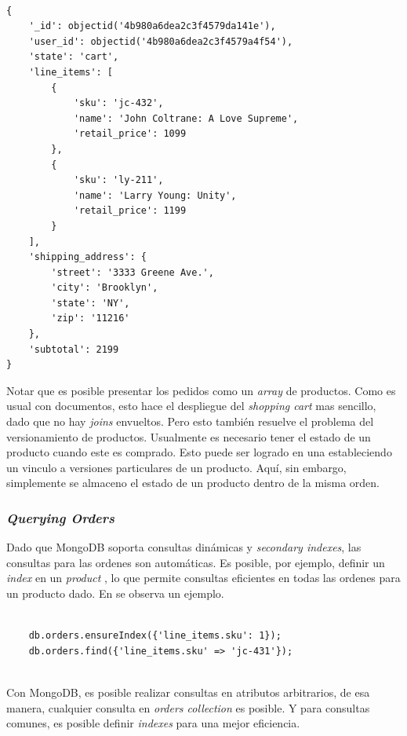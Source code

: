 \medskip
\begin{lstlisting}[caption= Estructura de una orden., label=source:javascript:example_schema_order]

{
	'_id': objectid('4b980a6dea2c3f4579da141e'),
	'user_id': objectid('4b980a6dea2c3f4579a4f54'),
	'state': 'cart',
	'line_items': [
		{
			'sku': 'jc-432',
			'name': 'John Coltrane: A Love Supreme',
			'retail_price': 1099
		},
		{
			'sku': 'ly-211',
			'name': 'Larry Young: Unity',
			'retail_price': 1199
		}
	],
	'shipping_address': {
		'street': '3333 Greene Ave.',
		'city': 'Brooklyn',
		'state': 'NY',
		'zip': '11216'
	},
	'subtotal': 2199
}
\end{lstlisting}

Notar que es posible presentar los pedidos como un \textit{array} de productos. Como es usual con documentos, esto hace el despliegue del \textit{shopping cart} mas sencillo, dado que no hay \textit{joins} envueltos. Pero esto también resuelve el problema del versionamiento de productos. Usualmente es necesario tener el estado de un producto cuando este es comprado. Esto puede ser logrado en una  estableciendo un vinculo a versiones particulares de un producto. Aquí, sin embargo, simplemente se almaceno el estado de un producto dentro de la misma orden.

\subsubsection{\textit{Querying Orders}}

Dado que MongoDB soporta consultas dinámicas y \textit{secondary indexes}, las consultas para las ordenes son automáticas. Es posible, por ejemplo, definir un \textit{index} en un \textit{product }, lo que permite consultas eficientes en todas las ordenes para un producto dado. En   se observa un ejemplo.

\medskip
\begin{lstlisting}[caption= Consulta eficiente con \textit{secondary indexes}., label=source:javascript:example_querying_orders_mongodb]

	db.orders.ensureIndex({'line_items.sku': 1});
	db.orders.find({'line_items.sku' => 'jc-431'});
	
\end{lstlisting}

Con MongoDB, es posible realizar consultas en atributos arbitrarios, de esa manera, cualquier consulta en \textit{orders collection} es posible. Y para consultas comunes, es posible definir \textit{indexes} para una mejor eficiencia.

